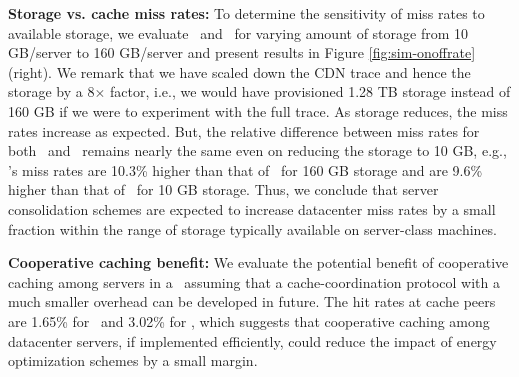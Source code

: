 \textbf{Storage vs. cache miss rates:} To determine the sensitivity of miss rates to available storage, we evaluate \peakS\  and \shrink\ for varying amount of storage from 10 GB/server to 160 GB/server and present results in Figure \ref{fig:sim-onoffrate} (right). We remark that we have scaled down the CDN trace and hence the storage by a 8$\times$ factor, i.e., we would have provisioned 1.28 TB storage instead of 160 GB if we were to experiment with the full trace.  As storage reduces, the miss rates increase as expected. But, the relative difference between miss rates for both \shrink\ and \peakS\  remains nearly the same even on reducing the storage to 10 GB, e.g., \shrink's miss rates are 10.3\% higher than that of \peakS\  for 160 GB storage and are 9.6\% higher than that of \peakS\  for 10 GB storage. Thus, we conclude that server consolidation schemes are expected to increase datacenter miss rates by a small fraction within the range of storage typically available on server-class machines. 

\textbf{Cooperative caching benefit:} We evaluate the potential benefit of cooperative caching among servers in a \cdc\ assuming that a cache-coordination protocol with a much smaller overhead can be developed in future. The hit rates at cache peers  are 1.65\% for \peakS\  and 3.02\% for \shrink, which suggests that cooperative caching among datacenter servers, if implemented efficiently, could reduce the impact of energy optimization schemes by a small margin. 

%




